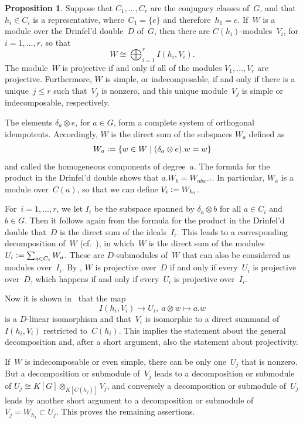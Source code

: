 \documentclass[12pt]{article}
\makeatletter
\theoremstyle{definition}
\newtheorem{Proposition}[Satz]{Proposition}
\theoremstyle{break}
\renewenvironment{proof}[1][\proofname]{\par
\vspace{-5pt}%
\pushQED{\qed}%
\normalfont
\topsep0pt \partopsep0pt %
\trivlist
\item[\hskip\labelsep
\bfseries
#1\@addpunct{.}]\ignorespaces
}{%
\popQED\endtrivlist\@endpefalse
\addvspace{6pt plus 6pt} %
}
\renewcommand{\1}{\mathbbm{1}}
\newcommand{\ot}{\mathbin{\otimes}}
\newcommand{\deq}{\vcentcolon =}
\newcommand\Cent{C}
\makeatother
\begin{document}
\begin{Proposition}
Suppose that $C_1,\ldots,C_r$ are the conjugacy classes of~$G$, and that $h_i \in C_i$ is a representative, where~$C_1 = \{e\}$ and therefore~$h_1=e$. If~$W$ is a module over the Drinfel'd double~$D$ of~$G$, then there are $\Cent(h_i)$-modules~$V_i$, for $i=1,\ldots,r$, so that
\[W \cong \bigoplus_{i=1}^r I(h_i, V_i).\]
The module~$W$ is projective if and only if all of the modules $V_1,\ldots,V_r$ are projective. 
Furthermore, $W$ is simple, or indecomposable, if and only if there is a unique~\mbox{$j \le r$} such that~$V_j$ is nonzero, and this unique module~$V_j$ is simple or indecomposable, respectively. 
\end{Proposition}
\begin{proof}
The elements $\delta_a \ot e$, for $a \in G$, form a complete system of orthogonal idempotents. Accordingly, $W$ is the direct sum of the subspaces $W_a$ defined as
\[W_a \deq \{w \in W \mid (\delta_a \ot e).w = w \}\]
and called the homogeneous components of degree~$a$. The formula for the product in the Drinfel'd double shows that $a.W_b = W_{aba^{-1}}$. In particular, $W_a$ is a module over~$\Cent(a)$, so that we can define $V_i \deq W_{h_i}$.

For~$i=1,\ldots,r$, we let $I_i$ be the subspace spanned by $\delta_a \ot b$ for all $a \in C_i$ and~$b \in G$. Then it follows again from the formula for the product in the Drinfel'd double that~$D$ is the direct sum of the ideals~$I_i$. This leads to a corresponding decomposition of~$W$ (cf.~\cite[Chap.~0, Exerc.~6, p.~17]{FD}), in which~$W$ is the direct sum of the modules $U_i \deq \sum_{a \in C_i} W_a$. These are $D$-submodules of~$W$ that can also be considered as modules over~$I_i$. By \cite[Chap.~I, Prop.~4.5, p.~24]{HiS}, $W$ is projective over~$D$ if and only if every~$U_i$ is projective over~$D$, which happens if and only if every~$U_i$ is projective over~$I_i$.

Now it is shown in~\cite[Lem.~1.4.16, p.~32]{HeS} that the map 
\[I(h_i, V_i) \to U_i,~a \ot w \mapsto a.w\]
is a $D$-linear isomorphism and that~$V_i$ is isomorphic to a direct summand of $I(h_i, V_i)$ restricted to~$\Cent(h_i)$. This implies the statement about the general decomposition and, after a short argument, also the statement about projectivity.

If~$W$ is indecomposable or even simple, there can be only one~$U_j$ that is nonzero. But a decomposition or submodule of~$V_j$ leads to a decomposition or submodule of 
$U_j \cong K[G] \ot_{K[\Cent(h_j)]} V_j$, and conversely a decomposition or submodule of~$U_j$ leads by another short argument to a decomposition or submodule of~$V_j = W_{h_j} \subset U_j$. This proves the remaining assertions.
\end{proof}
\end{document}
